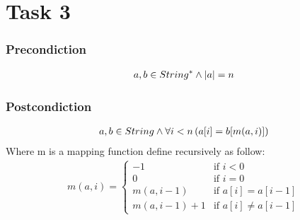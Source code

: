 \documentclass[a4paper,12pt,fleqn]{scrartcl}
\newcommand{\length}[1]{\left|#1\right|}
\begin{document}
\section{Task 3}
\subsubsection{Precondiction}
\begin{gather*}
    a,b\in String^*\And\length{a} = n
\end{gather*}
\subsubsection{Postcondiction}
\begin{gather*}
    a,b\in String \wedge\forall i < n\left(a[i] = b[m(a,i)]\right)
\end{gather*}
Where m is a mapping function define recursively as follow:
\begin{gather*}
    m(a,i) = 
    \begin{cases}
        -1          & \text{if } i<0\\
        0           & \text{if } i=0\\
        m(a,i-1)    & \text{if } a[i] = a[i-1]\\
        m(a,i-1) +1 & \text{if } a[i] \neq a[i-1]
    \end{cases}
\end{gather*}
\end{document}
